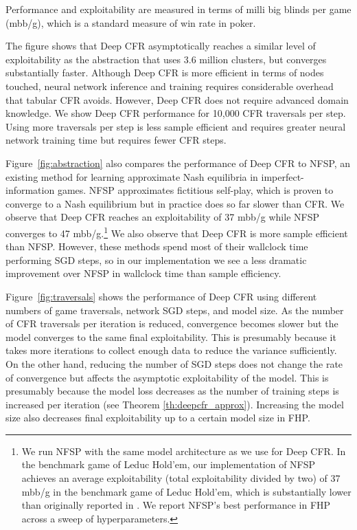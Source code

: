 \documentclass{article}
\begin{document}
Performance and exploitability are measured in terms of milli big blinds per game (mbb/g), which is a standard measure of win rate in poker.

The figure shows that Deep CFR asymptotically reaches a similar level of exploitability as the abstraction that uses 3.6 million clusters, but converges substantially faster. Although Deep CFR is more efficient in terms of nodes touched, neural network inference and training requires considerable overhead that tabular CFR avoids. However, Deep CFR does not require advanced domain knowledge. We show Deep CFR performance for 10,000 CFR traversals per step. Using more traversals per step is less sample efficient and requires greater neural network training time but requires fewer CFR steps.

Figure~\ref{fig:abstraction} also compares the performance of Deep CFR to NFSP, an existing method for learning approximate Nash equilibria in imperfect-information games. NFSP approximates fictitious self-play, which is proven to converge to a Nash equilibrium but in practice does so far slower than CFR. We observe that Deep CFR reaches an exploitability of 37 mbb/g while NFSP converges to 47 mbb/g.\footnote{We run NFSP with the same model architecture as we use for Deep CFR. In the benchmark game of Leduc Hold'em, our implementation of NFSP achieves an average exploitability (total exploitability divided by two) of 37 mbb/g in the benchmark game of Leduc Hold'em, which is substantially lower than originally reported in \citet{Heinrich16:Deep}. We report NFSP's best performance in FHP across a sweep of hyperparameters.} We also observe that Deep CFR is more sample efficient than NFSP. However, these methods spend most of their wallclock time performing SGD steps, so in our implementation we see a less dramatic improvement over NFSP in wallclock time than sample efficiency. 

Figure~\ref{fig:traversals} shows the performance of Deep CFR using different numbers of game traversals, network SGD steps, and model size. As the number of CFR traversals per iteration is reduced, convergence becomes slower but the model converges to the same final exploitability. This is presumably because it takes more iterations to collect enough data to reduce the variance sufficiently. On the other hand, reducing the number of SGD steps does not change the rate of convergence but affects the asymptotic exploitability of the model. This is presumably because the model loss decreases as the number of training steps is increased per iteration (see Theorem \ref{th:deepcfr_approx}). Increasing the model size also decreases final exploitability up to a certain model size in FHP. 
\end{document}
